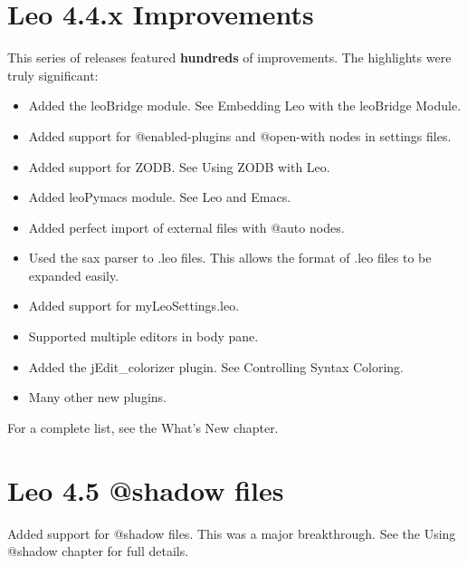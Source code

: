 \documentclass[a4paper,10pt,english]{sphinxmanual}
\begin{document}
\section{Leo 4.4.x Improvements}
\label{history:leo-4-4-x-improvements}
This series of releases featured \textbf{hundreds} of improvements.  The highlights were truly significant:
\begin{itemize}
\item {} 
Added the leoBridge module. See Embedding Leo with the leoBridge Module.

\item {} 
Added support for @enabled-plugins and @open-with nodes in settings files.

\item {} 
Added support for ZODB. See Using ZODB with Leo.

\item {} 
Added leoPymacs module. See Leo and Emacs.

\item {} 
Added perfect import of external files with @auto nodes.

\item {} 
Used the sax parser to .leo files. This allows the format of .leo files to be
expanded easily.

\item {} 
Added support for myLeoSettings.leo.

\item {} 
Supported multiple editors in body pane.

\item {} 
Added the jEdit\_colorizer plugin. See Controlling Syntax Coloring.

\item {} 
Many other new plugins.

\end{itemize}

For a complete list, see the What's New chapter.


\section{Leo 4.5 @shadow files}
\label{history:leo-4-5-shadow-files}
Added support for @shadow files. This was a major breakthrough.
See the Using @shadow chapter for full details.
\end{document}
